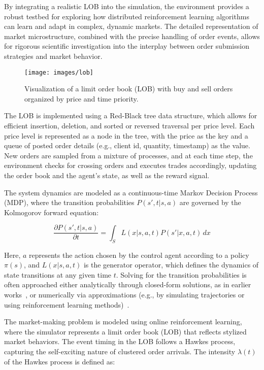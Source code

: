 \documentclass[11pt]{article}
\begin{document}
    By integrating a realistic LOB into the simulation, the environment provides a robust testbed for exploring how
    distributed reinforcement learning algorithms can learn and adapt in complex, dynamic markets.
    The detailed representation of market microstructure, combined with the precise handling of order events,
    allows for rigorous scientific investigation into the interplay between order submission strategies and market behavior.

    \begin{figure}[htb]
        \centering
        \texttt{[image: images/lob]}
        \caption{Visualization of a limit order book (LOB) with buy and sell orders organized by price and time priority.}
        \label{fig:lob}
    \end{figure}

    The LOB is implemented using a Red-Black tree data structure, which allows for efficient insertion, deletion,
    and sorted or reversed traversal per price level.
    Each price level is represented as a node in the tree, with the price as the key and a queue of posted order details
    (e.g., client id, quantity, timestamp) as the value.
    New orders are sampled from a mixture of processes, and at each time step, the environment checks for crossing orders and executes trades accordingly,
    updating the order book and the agent's state, as well as the reward signal.

    The system dynamics are modeled as a continuous-time Markov Decision Process (MDP), where the transition probabilities
    \( P(s', t|s, a) \) are governed by the Kolmogorov forward equation:

    \[
        \frac{\partial P(s', t|s, a)}{\partial t} = \int_S L(x|s, a, t) P(s'|x, a, t) \, dx
    \]

    Here, \( a \) represents the action chosen by the control agent according to a policy \( \pi(s) \), and \( L(x|s, a, t) \) is the generator operator,
    which defines the dynamics of state transitions at any given time \( t \).
    Solving for the transition probabilities is often approached either analytically through closed-form solutions,
    as in earlier works~\citep{Avellaneda2008, Gueant2017},
    or numerically via approximations (e.g., by simulating trajectories or using reinforcement learning methods)~\citep{Gueant2022, Gasperov2022, Guo2023}.

    The market-making problem is modeled using online reinforcement learning, where the simulator represents a
    limit order book (LOB) that reflects stylized market behaviors.
    The event timing in the LOB follows a Hawkes process, capturing the self-exciting nature of clustered order arrivals.
    The intensity \( \lambda(t) \) of the Hawkes process is defined as:
\end{document}
